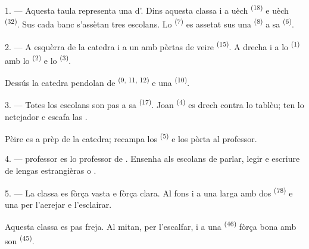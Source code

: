 \VUsaut{2.0mm}
\VUsaut{3.2mm}
\VUsaut{2.6mm}
\VUsaut{3.4mm}
\VUornamento{9pt}
\VUsaut{5.0mm}
\VUsaut{3.0mm}
\VUfilet{16mm}
\VUsaut{5.6mm}

\VUsaut{1.4mm}
\VUsaut{2.2mm}
\VUfilet{20mm}
\VUsaut{6.4mm}

\VUsaut{3.0mm}

1. --- Aquesta taula representa una  d'. Dins
aquesta classa i a uèch  \textsuperscript{(18)} e uèch
 \textsuperscript{(32)}. Sus cada banc s'assètan tres escolans. Lo
 \textsuperscript{(7)} es assetat sus una 
\textsuperscript{(8)} a sa  \textsuperscript{(6)}.

2. --- A esquèrra de la catedra i a un  amb pòrtas de veire
\textsuperscript{(15)}. A drecha i a lo 
\textsuperscript{(1)} amb lo  \textsuperscript{(2)} e lo
 \textsuperscript{(3)}.

Dessús la catedra pendolan de 
\textsuperscript{(9, 11, 12)} e una  \textsuperscript{(10)}.

3. --- Totes los escolans son pas a sa  \textsuperscript{(17)}. Joan
\textsuperscript{(4)} es drech contra lo tablèu; ten lo netejador e escafa las
.

Pèire es a prèp de la catedra; recampa los 
\textsuperscript{(5)} e los pòrta al professor.

4. ---  professor es lo professor de .
Ensenha als escolans de parlar, legir e escriure de lengas estrangièras
 o .

5. --- La classa es fòrça vasta e fòrça clara. Al fons i a una 
larga amb dos  \textsuperscript{(78)} e una  per l'aerejar e l'esclairar.

Aquesta classa es pas freja. Al mitan, per l'escalfar, i a una 
\textsuperscript{(46)} fòrça bona amb son  \textsuperscript{(45)}.


